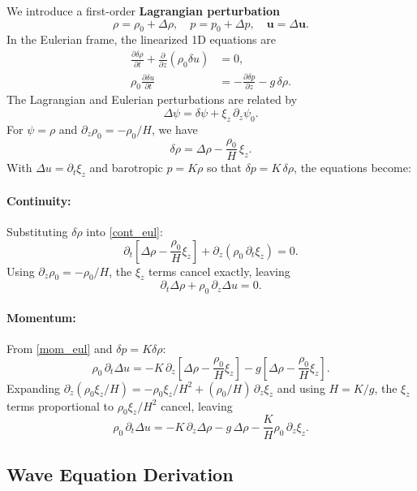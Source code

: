 We introduce a first-order \textbf{Lagrangian perturbation}
\[
\rho = \rho_0 + \Delta\rho, \quad
p = p_0 + \Delta p, \quad
\mathbf{u} = \Delta \mathbf{u}.
\]
In the Eulerian frame, the linearized 1D equations are
\begin{align}
\frac{\partial \delta \rho}{\partial t} + \frac{\partial}{\partial z} (\rho_0 \delta u) &= 0, \label{cont_eul}\\
\rho_0 \frac{\partial \delta u}{\partial t} &= - \frac{\partial \delta p}{\partial z} - g \, \delta \rho. \label{mom_eul}
\end{align}
The Lagrangian and Eulerian perturbations are related by
\[
\Delta \psi = \delta\psi + \xi_z \, \partial_z \psi_0.
\]
For $\psi = \rho$ and $\partial_z \rho_0 = -\rho_0/H$, we have
\[
\delta \rho = \Delta\rho - \frac{\rho_0}{H} \, \xi_z.
\]
With $\Delta u = \partial_t \xi_z$ and barotropic $p = K \rho$ so that $\delta p = K\,\delta\rho$, the equations become:

\paragraph{Continuity:} Substituting $\delta\rho$ into \eqref{cont_eul}:
\[
\partial_t\!\left[ \Delta\rho - \frac{\rho_0}{H} \xi_z \right]
+ \partial_z\!\left( \rho_0 \, \partial_t \xi_z \right) = 0.
\]
Using $\partial_z \rho_0 = -\rho_0/H$, the $\xi_z$ terms cancel exactly, leaving
\begin{equation}
\partial_t \Delta\rho + \rho_0 \, \partial_z \Delta u = 0.
\label{cont_lag}
\end{equation}

\paragraph{Momentum:} From \eqref{mom_eul} and $\delta p = K \delta\rho$:
\[
\rho_0 \, \partial_t \Delta u = -K \, \partial_z\!\left[ \Delta\rho - \frac{\rho_0}{H} \xi_z \right]
- g\!\left[ \Delta\rho - \frac{\rho_0}{H} \xi_z \right].
\]
Expanding $\partial_z(\rho_0 \xi_z/H) = -\rho_0 \xi_z/H^2 + (\rho_0/H)\,\partial_z \xi_z$ and using $H = K/g$, the $\xi_z$ terms proportional to $\rho_0 \xi_z/H^2$ cancel, leaving
\begin{equation}
\rho_0 \, \partial_t \Delta u = -K \, \partial_z \Delta\rho - g \, \Delta\rho - \frac{K}{H} \rho_0 \, \partial_z \xi_z.
\label{mom_lag}
\end{equation}

\subsection*{Wave Equation Derivation}

